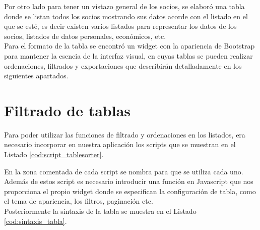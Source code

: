 \bigskip



\bigskip
\bigskip
\bigskip



\bigskip

Por otro lado para tener un vistazo general de los socios, se elaboró una tabla donde se listan todos los socios mostrando sus datos acorde con el listado en el que se esté, es decir existen varios listados para representar los 
datos de los socios, listados de datos personales, económicos, etc.\\

Para el formato de la tabla se encontró un widget con la  apariencia de Bootstrap para mantener la esencia de la interfaz visual, en cuyas tablas se pueden
realizar ordenaciones, filtrados y exportaciones que describirán detalladamente en los siguientes apartados.

\section{Filtrado de tablas}
\label{4:sec8}
Para poder utilizar las funciones de filtrado y ordenaciones en los listados, era necesario incorporar en nuestra aplicación los scripts que se muestran en el Listado \ref{cod:script_tablesorter}.\\



\bigskip

En la zona comentada de cada script se nombra para que se utiliza cada uno. Además de estos script es necesario introducir una función en Javascript que nos  proporciona el propio widget donde se especifican la configuración de 
tabla, como el tema de apariencia, los filtros, paginación etc.\\

Posteriormente la sintaxis de la tabla se muestra en el Listado \ref{cod:sintaxis_tabla}.\\



